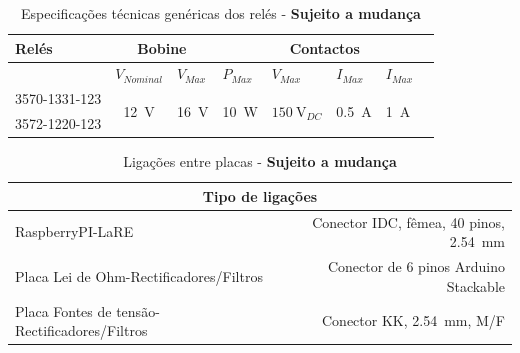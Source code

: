 \documentclass[a4paper,12pt,oneside,pdflatex,final,twocolumn]{article}
\begin{document}
\begin{table}[htb]
\caption{Especificações técnicas genéricas dos relés - \textbf{Sujeito a mudança}}
\centering
\begin{tabular}{lcclllll}
\toprule
Relés & \multicolumn{2}{c}{Bobine} & \multicolumn{5}{c}{Contactos}\\
\midrule
& \multicolumn{1}{l}{$V_{Nominal}$} & \multicolumn{1}{l}{$V_{Max}$} & $P_{Max}$ & $V_{Max}$ & $I_{Max}$ & $I_{Max}$\\
\midrule
3570-1331-123  & \multirow{2}{*}{\SI{12}{\volt}} & \multirow{2}{*}{\SI{16}{\volt}}  & \multirow{2}{*}{\SI{10}{\watt}} & \multirow{2}{*}{$\SI{150}{\volt}_{DC}$} & \multirow{2}{*}{\SI{0.5}{\ampere}} & \multirow{2}{*}{\SI{1}{\ampere}}\\
3572-1220-123 & & & & & & &\\                
\bottomrule
\end{tabular}%
\end{table}

\begin{table}[htb]
\caption{Ligações entre placas - \textbf{Sujeito a mudança}}
\centering
\begin{tabular}{lr}
\toprule
\multicolumn{2}{c}{Tipo de ligações}\\
\midrule
RaspberryPI-LaRE & Conector IDC, fêmea, 40 pinos, \SI{2.54}{\mm}\\
Placa Lei de Ohm-Rectificadores/Filtros & Conector de 6 pinos Arduino Stackable\\
Placa Fontes de tensão-Rectificadores/Filtros &  Conector KK, \SI{2.54}{\mm}, M/F \\
\bottomrule
\end{tabular}
\end{table}
\raggedright

\newpage

\tableofcontents
\listoftables

\newpage
\end{document}
